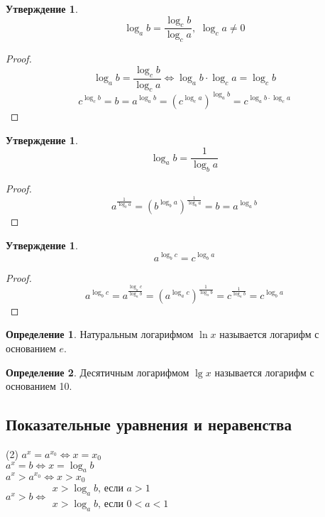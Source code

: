 \documentclass[12pt]{article}
\theoremstyle{definition}
\newtheorem{definition}{Определение}
\newtheorem{statement}[theorem]{Утверждение}
\begin{document}
    \begin{statement}
        $$\log_ab=\frac{\log_cb}{\log_ca},\,\,\log_ca\neq0$$
    \end{statement}
    \begin{proof}
        $$\log_ab=\frac{\log_cb}{\log_ca}\Longleftrightarrow\log_ab\cdot\log_ca=\log_cb$$
        $$c^{\log_cb}=b=a^{\log_ab}=\left(c^{\log_ca}\right)^{\log_ab}=c^{\log_ab\cdot\log_ca}$$
    \end{proof}
    \begin{statement}
        $$\log_ab=\frac{1}{\log_ba}$$
    \end{statement}
    \begin{proof}
        $$a^{\frac{1}{\log_ba}}=\left(b^{\log_ba}\right)^{\frac{1}{\log_ba}}=b=a^{\log_ab}$$
    \end{proof}
    \begin{statement}
        $$a^{\log_bc}=c^{\log_ba}$$
    \end{statement}
    \begin{proof}
        $$a^{\log_bc}=a^{\frac{\log_ac}{\log_ab}}=\left(a^{\log_ac}\right)^{\frac{1}{\log_ab}}=c^\frac{1}{\log_ab}=c^{\log_ba}$$
    \end{proof}
    \begin{definition}
        Натуральным логарифмом $\ln x$ называется логарифм с основанием $e$.
    \end{definition}
    \begin{definition}
        Десятичным логарифмом $\lg x$ называется логарифм с основанием 10.
    \end{definition}

    \subsection{Показательные уравнения и неравенства}

    \begin{tasks}(2)
    \task[] $a^x=a^{x_0}\Longleftrightarrow x=x_0$\\
    \task[] $a^x=b\Longleftrightarrow x=\log_ab$\\
    \task[] $a^x>a^{x_0}\Longleftrightarrow x>x_0$\\
    \task[] $a^x>b\Longleftrightarrow\begin{array}{l}
        x>\log_ab\text{, если }a>1\\
        x>\log_ab\text{, если }0<a<1
    \end{array}$
    \end{tasks}
\end{document}

